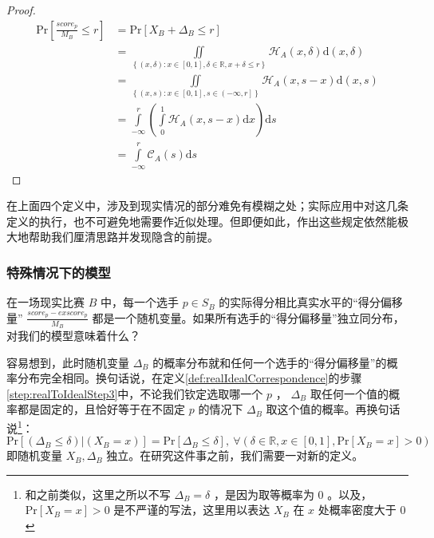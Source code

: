            \begin{proof}
                \begin{align*}
                    \mathrm{Pr}\left[\frac{\textit{score}_p}{M_B}\leq r\right]
                    &=\mathrm{Pr}\left[X_B+\Delta_B\leq r\right] \\
                    &=\iint\limits_{\left\{(x,\delta):x\in\left[0,1\right],\delta\in\mathbb{R},x+\delta\leq r\right\}}\mathcal{H}_A(x,\delta)\mathrm{d}(x,\delta) \\
                    &=\iint\limits_{\left\{(x,s):x\in\left[0,1\right],s\in\left(-\infty,r\right]\right\}}\mathcal{H}_A(x,s-x)\mathrm{d}(x,s) \\
                    &=\int\limits_{-\infty}^r\left(\int\limits_0^1 \mathcal{H}_A(x,s-x)\mathrm{d}x\right)\mathrm{d}s \\
                    &=\int\limits_{-\infty}^r \mathcal{C}_A(s)\mathrm{d}s
                \end{align*}
            \end{proof}

            在上面四个定义中，涉及到现实情况的部分难免有模糊之处；实际应用中对这几条定义的执行，也不可避免地需要作近似处理。但即便如此，作出这些规定依然能极大地帮助我们厘清思路并发现隐含的前提。

        \subsubsection{特殊情况下的模型}

            在一场现实比赛 $B$ 中，每一个选手 $p\in S_B$ 的实际得分相比真实水平的“得分偏移量” $\frac{\textit{score}_p-\textit{exscore}_p}{M_B}$ 都是一个随机变量。如果所有选手的“得分偏移量”独立同分布，对我们的模型意味着什么？

            容易想到，此时随机变量 $\Delta_B$ 的概率分布就和任何一个选手的“得分偏移量”的概率分布完全相同。换句话说，在定义\ref{def:realIdealCorrespondence}的步骤\ref{step:realToIdealStep3}中，不论我们钦定选取哪一个 $p$ ， $\Delta_B$ 取任何一个值的概率都是固定的，且恰好等于在不固定 $p$ 的情况下 $\Delta_B$ 取这个值的概率。再换句话说\footnote{和之前类似，这里之所以不写 $\Delta_B=\delta$ ，是因为取等概率为 $0$ 。以及， $\mathrm{Pr}\left[X_B=x\right]>0$ 是不严谨的写法，这里用以表达 $X_B$ 在 $x$ 处概率密度大于 $0$ }：$$\mathrm{Pr}\left[(\Delta_B\leq\delta)|(X_B=x)\right]=\mathrm{Pr}\left[\Delta_B\leq\delta\right],\ \forall \left(\delta\in\mathbb{R},x\in\left[0,1\right],\mathrm{Pr}\left[X_B=x\right]>0\right)$$即随机变量 $X_B,\Delta_B$ 独立。在研究这件事之前，我们需要一对新的定义。


